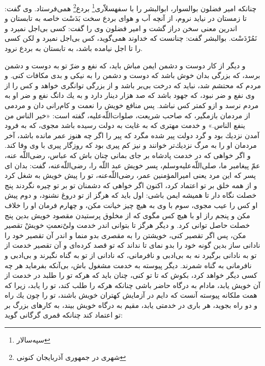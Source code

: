 چنانكه امير فضلون بوالسوار، ابوالبشر را با سفهسلاّرى\footnote{سپه‌سالار} بردع\footnote{شهری در جمهوری آذربایجان کنونی} همى‌فرستاد. وى گفت: تا زمستان در نيايد نروم، از آنچه آب و هواى بردع سخت بَدَسْت خاصه به تابستان و اندرين معنى سخن دراز گشت و امير فضلون وى را گفت: كسى بى‌اجل نميرد و نَمُرْدَسْت. بوالبشر گفت: چنانست كه خداوند همى‌گويد، كس بى‌اجل نميرد و لكن كسى را تا اجل نيامده باشد، به تابستان به بردع نرود.

و ديگر از كار دوست و دشمن ايمن مباش بايد، كه نفع و ضرّ تو به دوست و دشمن برسد، كه بزرگى بدان خوش باشد كه دوست و دشمن را به نيكى و بدى مكافات كنى. و مردم كه محتشم شد، نبايد كه درخت بى‌بر باشد و از بزرگى توانگرى خواهد و كس را از وى نفع و ضر نبود، كه جهود باشد كه صد هزار دينار دارد و به يك دانگ نفع و ضر او به مردم نرسد و ازو كمتر كس نباشد. پس منافع خويش را نعمت و كام‌رانى دان و مردمى از مردمان بازمگير، كه صاحب شريعت، صلوات‌اللّه‌عليه، گفته است: «خير الناس من ينفع الناس.» و خدمت مهترى كه به غايت به دولت رسيده باشد مجوى، كه به فرود آمدن نزديك بود و گرد دولت پير شده مگرد كه پير را اگر چه هنوز عمر مانده باشد، آخر مردمان او را به مرگ نزديك‌تر خوانند و نيز كم پيرى بود كه روزگار پيرى با وى وفا كند. و اگر خواهى كه در خدمت پادشاه بر جاى بمانى چنان باش كه عباس، رضى‌اللّه عنه، عمّ پيغامبر ما، صلى‌اللّه‌عليه‌و‌سلم، پسر خويش عبد اللّه را، رضى‌اللّه‌عنه،‌ گفت: بدان اى پسر كه اين مرد يعنى امير‌المؤمنين عمر، رضى‌اللّه‌عنه، تو را پيش خويش به شغل كرد و از همه خلق بر تو اعتماد كرد، اكنون اگر خواهى كه دشمنان تو بر تو چيره نگردند پنج خصلت نگاه دار تا هميشه ايمن باشى: اول بايد كه هرگز از تو دروغ نشنود، و دوم پيش او كس را عيب مجوى، سوم با وى به هيچ چيز خيانت مكن، و چهارم فرمان او را خلاف مكن و پنجم راز او با هيچ كس مگوى كه از مخلوق پرستيدن مقصود خويش بدين پنج خصلت حاصل توانى كرد. و ديگر هرگز تا بتوانى اندر خدمت ولى‌ْنعمتِ خويشْ تقصير مكن، پس اگر تقصير كنى، خويشتن را به مقصرى بدو منما و اندر آن تقصير خود را نادانى ساز بدين گونه خود را بدو نماى تا نداند كه تو قصد كرده‌اى و آن تقصير خدمت از تو به نادانى برگيرد نه به بى‌ادبى و نافرمانى، كه نادانى از تو به گناه نگيرند و بى‌ادبى و نافرمانى به گناه شمرند. ديگر پيوسته به خدمت مشغول باش، بى‌آنكه بفرمايد هر چه كسى ديگر خواهد كرد، بكوش كه تا تو كنى، چنان بايد كه هرکه تو را طلبد در خدمت از آن خويش يابد، مادام به درگاه حاضر باشى چنانكه هركه را طلب كند، تو را يابد، زيرا كه همت ملكانه پيوسته آنست كه دايم در آزمايش كهتران خويش باشند، تو را چون يك راه و دو راه بجويد، هر بارى در خدمتى يابد، مقيم به درگاه خويش بيند، به كارهاى بزرگ بر تو اعتماد كند چنانكه قمرى گرگانى گويد: 

